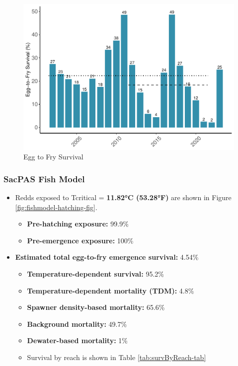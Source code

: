 \documentclass[
]{book}
\providecommand{\tightlist}{%
  \setlength{\itemsep}{0pt}\setlength{\parskip}{0pt}}
\theoremstyle{definition}
\theoremstyle{definition}
\theoremstyle{definition}
\theoremstyle{definition}
\theoremstyle{remark}
\begin{document}
\begin{figure}
\centering
\includegraphics{_main_files/figure-latex/ETFSurv-fig-1.pdf}
\caption{\label{fig:ETFSurv-fig}Egg to Fry Survival}
\end{figure}

\hypertarget{sacpas-fish-model}{%
\subsubsection{SacPAS Fish Model}\label{sacpas-fish-model}}

\begin{itemize}
\tightlist
\item
  Redds exposed to Tcritical = \textbf{11.82°C (53.28°F)} are shown in Figure \ref{fig:fishmodel-hatching-fig}.

  \begin{itemize}
  \tightlist
  \item
    \textbf{Pre-hatching exposure:} 99.9\%
  \item
    \textbf{Pre-emergence exposure:} 100\%
  \end{itemize}
\item
  \textbf{Estimated total egg-to-fry emergence survival:} 4.54\%

  \begin{itemize}
  \tightlist
  \item
    \textbf{Temperature-dependent survival:} 95.2\%
  \item
    \textbf{Temperature-dependent mortality (TDM):} 4.8\%
  \item
    \textbf{Spawner density-based mortality:} 65.6\%
  \item
    \textbf{Background mortality:} 49.7\%
  \item
    \textbf{Dewater-based mortality:} 1\%
  \item
    Survival by reach is shown in Table \ref{tab:survByReach-tab}
  \end{itemize}
\end{itemize}
\end{document}
